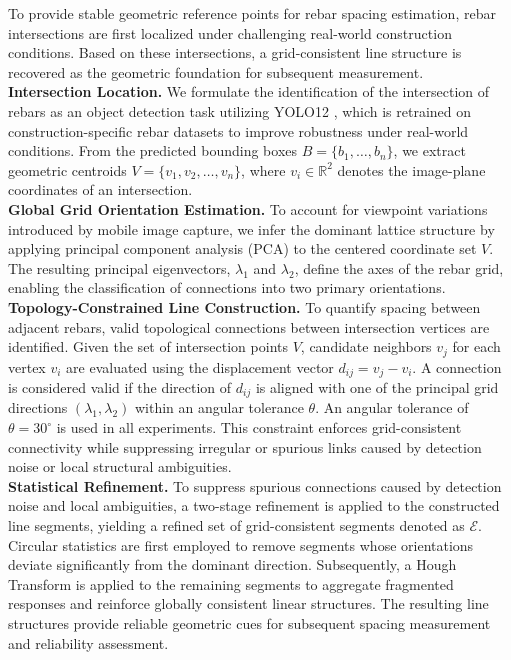 \documentclass{article}
\begin{document}
To provide stable geometric reference points for rebar spacing estimation, rebar intersections are first localized under challenging real-world construction conditions. Based on these intersections, a grid-consistent line structure is recovered as the geometric foundation for subsequent measurement.\\
\noindent \textbf{Intersection Location.} We formulate the identification of the intersection of rebars as an object detection task utilizing YOLO12 \cite{tian2025yolov12}, which is retrained on construction-specific rebar datasets to improve robustness under real-world conditions. From the predicted bounding boxes $B=\{b_1, \dots, b_n\}$, we extract geometric centroids $V=\{v_1, v_2, \dots, v_n\}$, where $v_i \in \mathbb{R}^2$ denotes the image-plane coordinates of an intersection.\\
\noindent \textbf{Global Grid Orientation Estimation.}
To account for viewpoint variations introduced by mobile image capture, we infer the dominant lattice structure by applying principal component analysis (PCA) to the centered coordinate set $V$. The resulting principal eigenvectors, $\lambda_1$ and $\lambda_2$, define the axes of the rebar grid, enabling the classification of connections into two primary orientations.\\
\noindent \textbf{Topology-Constrained Line Construction.}
To quantify spacing between adjacent rebars, valid topological connections between intersection vertices are identified. Given the set of intersection points $V$, candidate neighbors $v_j$ for each vertex $v_i$ are evaluated using the displacement vector $d_{ij} = v_j - v_i$. A connection is considered valid if the direction of $d_{ij}$ is aligned with one of the principal grid directions $(\lambda_1, \lambda_2)$ within an angular tolerance $\theta$. An angular tolerance of $\theta = 30^\circ$ is used in all experiments. This constraint enforces grid-consistent connectivity while suppressing irregular or spurious links caused by detection noise or local structural ambiguities.\\
\noindent \textbf{Statistical Refinement.}
To suppress spurious connections caused by detection noise and local ambiguities, a two-stage refinement is applied to the constructed line segments, yielding a refined set of grid-consistent segments denoted as $\mathcal{E}$. Circular statistics are first employed to remove segments whose orientations deviate significantly from the dominant direction. Subsequently, a Hough Transform \cite{galamhos1999progressive} is applied to the remaining segments to aggregate fragmented responses and reinforce globally consistent linear structures. The resulting line structures provide reliable geometric cues for subsequent spacing measurement and reliability assessment.
\end{document}
